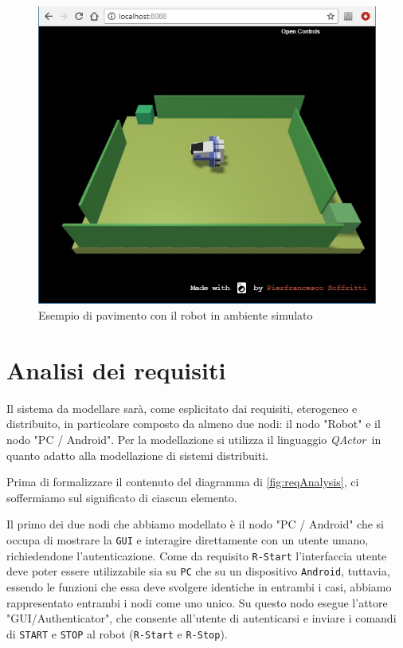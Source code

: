 \documentclass{llncs}
\newcommand{\action}[1]{\texttt{#1}\xspace}
\newcommand{\code}[1]{{\color{blue}\small{\texttt{#1}}}}
\newcommand{\qa}{\textsf{\textit{QActor}}}
\newcommand{\labelsec}[1]{\label{sec:#1}}
\begin{document}
\begin{figure}
\centering
\includegraphics[scale=0.7]{img/virtualRobot.jpg}
\caption{Esempio di pavimento con il robot in ambiente simulato}
\label{fig:virtualrobot}
\end{figure}

%
\section{Analisi dei requisiti}
\labelsec{ReqAnalysis}
Il sistema da modellare sarà, come esplicitato dai requisiti, eterogeneo e distribuito, in particolare composto da almeno due nodi: il nodo "Robot" e il nodo "PC / Android". 
Per la modellazione si utilizza il linguaggio \qa\ in quanto adatto alla modellazione di sistemi distribuiti.

Prima di formalizzare il contenuto del diagramma di  \ref{fig:reqAnalysis}, ci soffermiamo sul significato di ciascun elemento. 

Il primo dei due nodi che abbiamo modellato è il nodo "PC / Android" che si occupa di mostrare la \action{GUI} e interagire direttamente con un utente umano, richiedendone l'autenticazione. Come da requisito \code{R-Start} l'interfaccia utente deve poter essere utilizzabile sia su \action{PC} che su un dispositivo \action{Android}, tuttavia, essendo le funzioni che essa deve svolgere identiche in entrambi i casi, abbiamo rappresentato entrambi i nodi come uno unico. Su questo nodo esegue l'attore "GUI/Authenticator", che consente all'utente di autenticarsi e inviare i comandi di \action{START} e \action{STOP} al robot (\code{R-Start} e \code{R-Stop}). 
\end{document}
